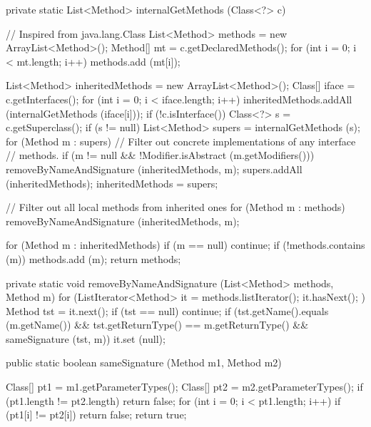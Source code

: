 \begin{htmlonly}
\end{htmlonly}
\begin{code}\begin{hide}

   private static List<Method> internalGetMethods (Class<?> c) {
      // Inspired from java.lang.Class
      List<Method> methods = new ArrayList<Method>();
      Method[] mt = c.getDeclaredMethods();
      for (int i = 0; i < mt.length; i++)
         methods.add (mt[i]);

      List<Method> inheritedMethods = new ArrayList<Method>();
      Class[] iface = c.getInterfaces();
      for (int i = 0; i < iface.length; i++)
         inheritedMethods.addAll (internalGetMethods (iface[i]));
      if (!c.isInterface()) {
         Class<?> s = c.getSuperclass();
         if (s != null) {
            List<Method> supers = internalGetMethods (s);
            for (Method m : supers) {
               // Filter out concrete implementations of any interface
               // methods.
               if (m != null && !Modifier.isAbstract (m.getModifiers()))
                  removeByNameAndSignature (inheritedMethods, m);
            }
            supers.addAll (inheritedMethods);
            inheritedMethods = supers;
         }
      }
      
      // Filter out all local methods from inherited ones
      for (Method m : methods)
         removeByNameAndSignature (inheritedMethods, m);
      
      for (Method m : inheritedMethods) {
         if (m == null)
            continue;
         if (!methods.contains (m))
            methods.add (m);
      }
      return methods;
   }

   private static void removeByNameAndSignature (List<Method> methods, Method m) {
      for (ListIterator<Method> it = methods.listIterator(); it.hasNext(); ) {
         Method tst = it.next();
         if (tst == null)
            continue;
         if (tst.getName().equals (m.getName()) &&
             tst.getReturnType() == m.getReturnType() &&
             sameSignature (tst, m))
            it.set (null);
      }
   }\end{hide}

   public static boolean sameSignature (Method m1, Method m2)\begin{hide} {
      Class[] pt1 = m1.getParameterTypes();
      Class[] pt2 = m2.getParameterTypes();
      if (pt1.length != pt2.length)
         return false;
      for (int i = 0; i < pt1.length; i++)
         if (pt1[i] != pt2[i])
            return false;
      return true;
   }\end{hide}
\end{code}
